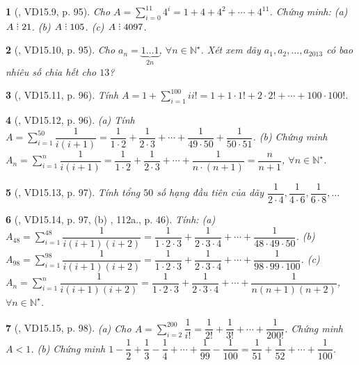\documentclass{article}
\newtheorem{baitoan}{}
\DeclareRobustCommand{\divby}{%
	\mathrel{\vbox{\baselineskip.65ex\lineskiplimit0pt\hbox{.}\hbox{.}\hbox{.}}}%
}
\begin{document}
\begin{baitoan}[\cite{TLCT_THCS_Toan_6_so_hoc}, VD15.9, p. 95]
	Cho $A = \sum_{i=0}^{11} 4^i = 1 + 4 + 4^2 + \cdots + 4^{11}$. Chứng minh: (a) $A\divby21$. (b) $A\divby105$. (c) $A\divby4097$.
\end{baitoan}

\begin{baitoan}[\cite{TLCT_THCS_Toan_6_so_hoc}, VD15.10, p. 95]
	Cho $a_n = \underbrace{1\ldots1}_{2n}$, $\forall n\in\mathbb{N}^\star$. Xét xem dãy $a_1,a_2,\ldots,a_{2013}$ có bao nhiêu số chia hết cho $13$?
\end{baitoan}

\begin{baitoan}[\cite{TLCT_THCS_Toan_6_so_hoc}, VD15.11, p. 96]
	Tính $A = 1 + \sum_{i=1}^{100} ii!  = 1 + 1\cdot1! + 2\cdot2! + \cdots + 100\cdot100!$.
\end{baitoan}

\begin{baitoan}[\cite{TLCT_THCS_Toan_6_so_hoc}, VD15.12, p. 96]
	(a) Tính $A = \sum_{i=1}^{50} \dfrac{1}{i(i + 1)} = \dfrac{1}{1\cdot2} + \dfrac{1}{2\cdot3} + \cdots + \dfrac{1}{49\cdot50} + \dfrac{1}{50\cdot51}$. (b) Chứng minh $A_n = \sum_{i=1}^n \dfrac{1}{i(i + 1)} = \dfrac{1}{1\cdot2} + \dfrac{1}{2\cdot3} + \cdots + \dfrac{1}{n\cdot(n + 1)} = \dfrac{n}{n + 1}$, $\forall n\in\mathbb{N}^\star$.
\end{baitoan}

\begin{baitoan}[\cite{TLCT_THCS_Toan_6_so_hoc}, VD15.13, p. 97]
	Tính tổng $50$ số hạng đầu tiên của dãy $\dfrac{1}{2\cdot4},\dfrac{1}{4\cdot6},\dfrac{1}{6\cdot8},\ldots$
\end{baitoan}

\begin{baitoan}[\cite{TLCT_THCS_Toan_6_so_hoc}, VD15.14, p. 97, (b) \cite{Binh_boi_duong_Toan_6_tap_2}, 112a., p. 46]
	Tính: (a) $A_{48} = \sum_{i=1}^{48} \dfrac{1}{i(i + 1)(i + 2)} = \dfrac{1}{1\cdot2\cdot3} + \dfrac{1}{2\cdot3\cdot4} + \cdots + \dfrac{1}{48\cdot49\cdot50}$. (b) $A_{98} = \sum_{i=1}^{98} \dfrac{1}{i(i + 1)(i + 2)} = \dfrac{1}{1\cdot2\cdot3} + \dfrac{1}{2\cdot3\cdot4} + \cdots + \dfrac{1}{98\cdot99\cdot100}$. (c) $A_n = \sum_{i=1}^n \dfrac{1}{i(i + 1)(i + 2)} = \dfrac{1}{1\cdot2\cdot3} + \dfrac{1}{2\cdot3\cdot4} + \cdots + \dfrac{1}{n(n + 1)(n + 2)}$, $\forall n\in\mathbb{N}^\star$.
\end{baitoan}

\begin{baitoan}[\cite{TLCT_THCS_Toan_6_so_hoc}, VD15.15, p. 98]
	(a) Cho $A = \sum_{i=2}^{200} \dfrac{1}{i!} = \dfrac{1}{2!} + \dfrac{1}{3!} + \cdots + \dfrac{1}{200!}$. Chứng minh $A < 1$. (b) Chứng minh $1 - \dfrac{1}{2} + \dfrac{1}{3} - \dfrac{1}{4} + \cdots + \dfrac{1}{99} - \dfrac{1}{100} = \dfrac{1}{51} + \dfrac{1}{52} + \cdots + \dfrac{1}{100}$.
\end{baitoan}
\end{document}
